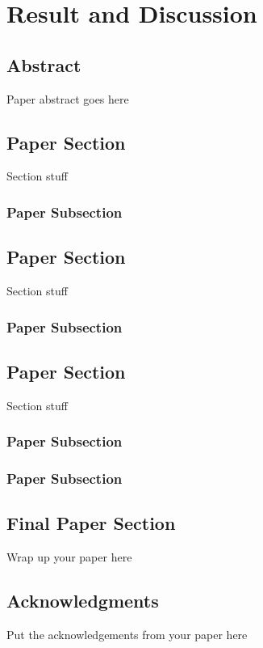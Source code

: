 \chapter{Result and Discussion}
\label{Chapter7}

\large {



\section{Abstract}
Paper abstract goes here
\section{Paper Section}
Section stuff

\subsection{Paper Subsection}
\section{Paper Section}
Section stuff

\subsection{Paper Subsection}
\section{Paper Section}
Section stuff

\subsection{Paper Subsection}

\subsection{Paper Subsection}
\section{Final Paper Section}
Wrap up your paper here

\section{Acknowledgments}
Put the acknowledgements from your paper here



}
